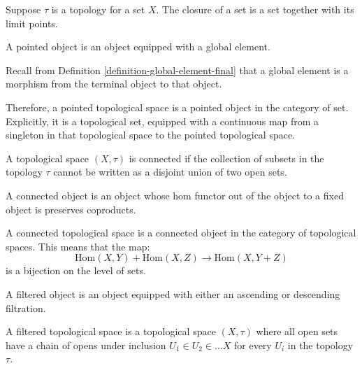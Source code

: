 \begin{definition}
	\label{definition-closure}
	Suppose $\tau$ is a topology for a set $X$.
	The closure of a set is a set together with its limit points.
\end{definition}

\begin{definition}
    \label{definition-pointed-topological-space}
    A pointed object is an object equipped with a global element.

    Recall from Definition \ref{definition-global-element-final} that a global element is a morphism from the terminal object to that object.

    Therefore, a pointed topological space is a pointed object in the category of set. Explicitly, it is a topological set, equipped with a continuous map from a singleton in that topological space to the pointed topological space.
\end{definition}

\begin{definition}
    \label{definition-connected-topological-space-disjoint}
    A topological space $(X, \tau)$
	is connected if the collection of subsets in the topology $\tau$ cannot be written as a disjoint union of two open sets.
\end{definition}

\begin{definition}
    \label{definition-connected-topological-space-internal}
    A connected object is an object whose hom functor out of the object to a fixed object is preserves coproducts.

	A connected topological space is a connected object in the category of topological spaces.
	This means that the map:
	\begin{equation}
		\mathrm{Hom}(X,Y) + \mathrm{Hom}(X,Z)
		\rightarrow \mathrm{Hom}(X,Y+Z)
	\end{equation}
	is a bijection on the level of sets.
\end{definition}

\begin{definition}
    \label{definition-filtered-topological-space}
    A filtered object is an object equipped with either an ascending or descending filtration.

	A filtered topological space is a topological space $(X, \tau)$ where all open sets have a chain of opens under inclusion $U_1 \in U_2 \in ... X$ for every $U_i$ in the topology $\tau$.
\end{definition}

